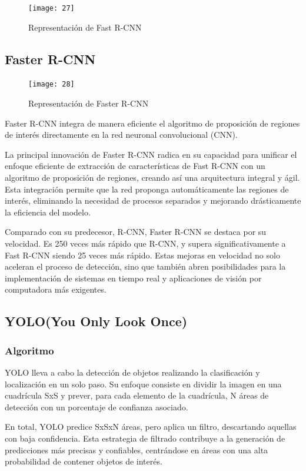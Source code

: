 	\begin{figure}[ht]
	    \centering
		\texttt{[image: 27]}
		\caption{Representación de Fast R-CNN}
	\end{figure}
	
	\subsection{Faster R-CNN}
	
	\begin{figure} 
		\centering
		\texttt{[image: 28]}
		\caption{Representación de Faster R-CNN}
	\end{figure}
	
	Faster R-CNN integra de manera eficiente el algoritmo de proposición de regiones de interés directamente en la red neuronal convolucional (CNN).
	
	La principal innovación de Faster R-CNN radica en su capacidad para unificar el enfoque eficiente de extracción de características de Fast R-CNN con un algoritmo de proposición de regiones, creando así una arquitectura integral y ágil. Esta integración permite que la red proponga automáticamente las regiones de interés, eliminando la necesidad de procesos separados y mejorando drásticamente la eficiencia del modelo.


	Comparado con su predecesor, R-CNN, Faster R-CNN se destaca por su velocidad. Es 250 veces más rápido que R-CNN, y supera significativamente a Fast R-CNN siendo 25 veces más rápido. Estas mejoras en velocidad no solo aceleran el proceso de detección, sino que también abren posibilidades para la implementación de sistemas en tiempo real y aplicaciones de visión por computadora más exigentes.
	
	\subsection{YOLO(You Only Look Once)}
	\subsubsection{Algoritmo}
	YOLO lleva a cabo la detección de objetos realizando la clasificación y localización en un solo paso. Su enfoque consiste en dividir la imagen en una cuadrícula SxS y prever, para cada elemento de la cuadrícula, N áreas de detección con un porcentaje de confianza asociado.
	
	En total, YOLO predice SxSxN áreas, pero aplica un filtro, descartando aquellas con baja confidencia. Esta estrategia de filtrado contribuye a la generación de predicciones más precisas y confiables, centrándose en áreas con una alta probabilidad de contener objetos de interés.
	
